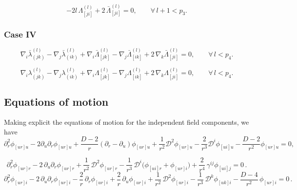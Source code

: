 \documentclass[a4paper,12pt]{article}
\begin{document}
\begin{equation}
-2l\,\Lambda_{[ji]}^{(l)}+2\,\bar\Lambda_{[ji]}^{(l)}=0,
\qquad \forall\, l+1<p_3 .
\end{equation}

\subsubsection*{Case IV}




\begin{equation}
\nabla_i \bar\lambda_{(jk)}^{(l)}
-\nabla_j \bar\lambda_{(ik)}^{(l)}
+\nabla_i \bar\Lambda_{[jk]}^{(l)}
-\nabla_j \bar\Lambda_{[ik]}^{(l)}
+2\,\nabla_k \bar\Lambda_{[ji]}^{(l)}
=0,
\qquad \forall\, l<p_4 .
\end{equation}


\begin{equation}
\nabla_i \lambda_{(jk)}^{(l)}
-\nabla_j \lambda_{(ik)}^{(l)}
+\nabla_i \Lambda_{[jk]}^{(l)}
-\nabla_j \Lambda_{[ik]}^{(l)}
+2\,\nabla_k \Lambda_{[ji]}^{(l)}
=0,
\qquad \forall\, l<p_4 .
\end{equation}
\subsection{Equations of motion}\label{B3}

Making explicit the equations of motion for the independent field components, we have
\begin{equation}
\partial_r^2\phi_{[ur]u}
-2\partial_u\partial_r\phi_{[ur]u}
+\frac{D-2}{r}(\partial_r-\partial_u)\phi_{[ur]u}
+\frac{1}{r^2}\mathcal{D}^2\phi_{[ur]u}
-\frac{2}{r^3}\mathcal{D}^i\phi_{[u i] u}
-\frac{D-2}{r^2}\phi_{[ur]u}=0 ,
\label{eq:box_uru}
\end{equation}


\begin{equation}
\partial_r^2 \phi_{[ur]r}-2\,\partial_u\partial_r \phi_{[ur]r}
+\frac{1}{r^2}\,\mathcal{D}^2 \phi_{[ur]r}
-\frac{1}{r^3}\,\mathcal{D}^i\!\Big(\phi_{[ui]r}+\phi_{[ur]i}\Big)
+\frac{2}{r^4}\,\gamma^{ij}\phi_{[ui]j}=0\, .
\end{equation}
\begin{equation}
\partial_r^2 \phi_{[ur]i}-2\,\partial_u\partial_r \phi_{[ur]i}
-\frac{2}{r}\,\partial_r \phi_{[ur]i}
+\frac{2}{r}\,\partial_u \phi_{[ur]i}
+\frac{1}{r^2}\,\mathcal{D}^2 \phi_{[ur]i}
-\frac{1}{r^3}\,\mathcal{D}^k \phi_{[uk]i}
-\frac{D-4}{r^2}\,\phi_{[ur]i}=0\, .
\end{equation}
\end{document}
